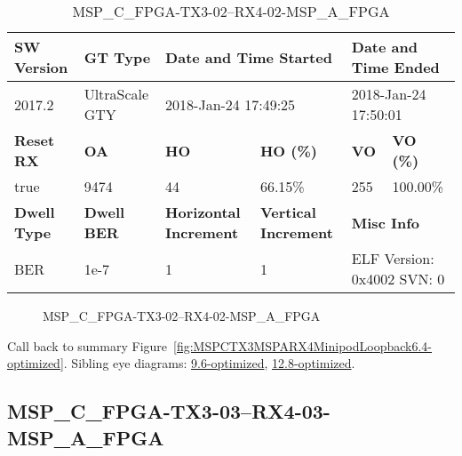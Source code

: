 \begin{table}[h]
\centering
\caption{MSP\_C\_FPGA-TX3-02--RX4-02-MSP\_A\_FPGA}
\label{tab:MSPCFPGATX302RX402MSPAFPGA6.4-optimized}
\begin{tabular}{@{}|l|l|l|l|l|l|@{}}
\toprule
\textbf{SW Version}                & \textbf{GT Type}   & \multicolumn{2}{l|}{\textbf{Date and Time Started}}            & \multicolumn{2}{l|}{\textbf{Date and Time Ended}}        \\ \midrule
2017.2                       & UltraScale GTY          & \multicolumn{2}{l|}{2018-Jan-24 17:49:25}                   & \multicolumn{2}{l|}{2018-Jan-24 17:50:01}               \\ \midrule
\textbf{Reset RX}                  & \textbf{OA} & \textbf{HO}   & \textbf{HO (\%)} & \textbf{VO} & \textbf{VO (\%)} \\ \midrule
true & 9474        & 44          & 66.15\%        & 255        & 100.00\%       \\ \midrule
\textbf{Dwell Type}                & \textbf{Dwell BER} & \textbf{Horizontal Increment} & \textbf{Vertical Increment}    & \multicolumn{2}{l|}{\textbf{Misc Info}}                  \\ \midrule
BER                            & 1e-7        & 1        & 1           & \multicolumn{2}{l|}{ELF Version: 0x4002 SVN: 0}                         \\ \bottomrule
\end{tabular}
\end{table}

\begin{figure}[h]
\caption{MSP\_C\_FPGA-TX3-02--RX4-02-MSP\_A\_FPGA} \label{fig:MSPCFPGATX302RX402MSPAFPGA6.4-optimized}
\end{figure}

Call back to summary Figure~\ref{fig:MSPCTX3MSPARX4MinipodLoopback6.4-optimized}.
Sibling eye diagrams: \hyperref[sec:MSPCFPGATX302RX402MSPAFPGA9.6-optimized]{9.6-optimized}, \hyperref[sec:MSPCFPGATX302RX402MSPAFPGA12.8-optimized]{12.8-optimized}.

\clearpage
\newpage


\subsection{MSP\_C\_FPGA-TX3-03--RX4-03-MSP\_A\_FPGA}\label{sec:MSPCFPGATX303RX403MSPAFPGA6.4-optimized}


